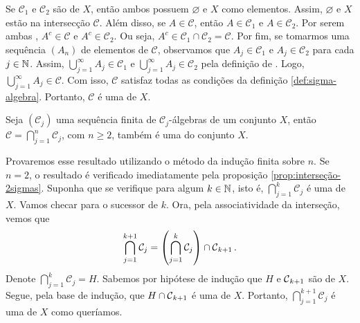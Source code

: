 \begin{prova}
    Se $\mathcal{C}_1$ e $\mathcal{C}_2$ são \sigals de $X$, então ambos possuem $\varnothing$ e $X$ como elementos.
    Assim, $\varnothing$ e $X$ estão na intersecção $\mathcal{C}$.
    Além disso, se $A \in \mathcal{C}$, então $A \in \mathcal{C}_1$ e $A \in \mathcal{C}_2$. 
    Por serem ambas \sigals, $A^c \in \mathcal{C}$ e $A^c \in \mathcal{C}_2$.
    Ou seja, $A^c \in \mathcal{C}_1 \cap \mathcal{C}_2 = \mathcal{C}$.
    Por fim, se tomarmos uma sequência $(A_n)$ de elementos de $\mathcal{C}$, observamos que $A_j \in \mathcal{C}_1$ e $A_j \in \mathcal{C}_2$ para cada $j \in \operatorname{\mathbb{N}}$.
    Assim, $\displaystyle \bigcup_{j = 1}^\infty A_j \in \mathcal{C}_1$ e 
    $\displaystyle \bigcup_{j = 1}^\infty A_j \in \mathcal{C}_2$ pela definição de \sigal.
    Logo, $\displaystyle \bigcup_{j = 1}^\infty A_j \in \mathcal{C}$.
    Com isso, $\mathcal{C}$ satisfaz todas as condições da definição \ref{def:sigma-algebra}. 
    Portanto, $\mathcal{C}$ é uma \sigal de $X$.
\end{prova}

\begin{proposition}
\label{prop:interseção-sigmas}
    Seja $(\mathcal{C}_j)$ uma sequência finita de $\mathcal{C}_j$-álgebras de um conjunto $X$, então 
    $\mathcal{C} = \displaystyle \bigcap_{j =1}^n\mathcal{C}_j$, com $n \geq 2$, também é uma \sigal do conjunto $X$.
    
\end{proposition}
\begin{prova}
    Provaremos esse resultado utilizando o método da indução finita sobre $n$.
    Se $n = 2$, o resultado é verificado imediatamente pela proposição \ref{prop:interseção-2sigmas}.
    Suponha que se verifique para algum $k \in \operatorname{\mathbb{N}}$, isto é, $\displaystyle \bigcap_{j =1}^k\mathcal{C}_j$ é uma \sigal de $X$.
    Vamos checar para o sucessor de $k$.
    Ora, pela associatividade da interseção, vemos que 
    \begin{align*}
        \displaystyle \bigcap_{j =1}^{k+1}\mathcal{C}_j = \left(\displaystyle \bigcap_{j =1}^k\mathcal{C}_j\right) \cap \operatorname{\mathcal{C}}_{k+1}.
  	\end{align*}
	Denote $\displaystyle \bigcap_{j =1}^k\mathcal{C}_j = H$. 
	Sabemos por hipótese de indução que $H$  e $\operatorname{\mathcal{C}}_{k+1}$ são  \sigals de $X$. 
	Segue, pela base de indução, que $H \cap \operatorname{\mathcal{C}}_{k+1}$ é uma \sigal de $X$.
	Portanto, $\displaystyle \bigcap_{j =1}^{k+1}\mathcal{C}_j$ é uma \sigal de $X$ como queríamos.
\end{prova}

